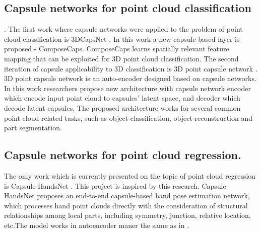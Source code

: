 \subsection{Capsule networks for point cloud classification}. The first work where capsule networks were applied to the problem of point cloud classification is 3DCapsNet \parencite{cheraghian_3dcapsule_2018}. In this work a new capsule-based layer is proposed - ComposeCaps. ComposeCaps learns spatially relevant feature mapping that can be exploited for 3D point cloud classification.
The second iteration of capsule applicability to 3D classification is 3D point capsule network \parencite{zhao_3d_2019}. 3D point capsule network is an auto-encoder designed based on capsule networks. In this work researchers propose new architecture with capsule network encoder which encode input point cloud to capsules' latent space, and decoder which decode latent capsules. The proposed architecture works for several common point cloud-related tasks, such as object classification, object reconstruction and part segmentation.

\subsection{Capsule networks for point cloud regression.} The only work which is currently presented on the topic of point cloud regression is Capsule-HandsNet \parencite{wu_3d_2020}. This project is inspired by this research. Capsule-HandsNet proposes an end-to-end capsule-based hand pose estimation network, which processes hand point clouds directly with the consideration of structural relationships among local parts, including symmetry, junction, relative location, etc.The model works in autoencoder maner the same as in \parencite{zhao_3d_2019}.
